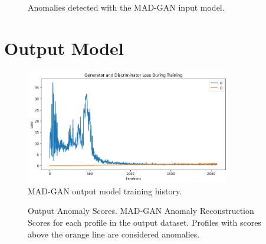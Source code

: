 \begin{figure}
    \caption{Anomalies detected with the MAD-GAN input model.}
    \label{fig_a:madgan_in_anomalies}
\end{figure}

\clearpage
\section{Output Model}

\begin{figure}[h]
    \centering
    \includegraphics[width=0.8\textwidth]{figures/madgan_train_hist_out.png}
    \caption{MAD-GAN output model training history.}
\end{figure}

\begin{figure}
    \centering
    \caption[Output Anomaly Scores]{Output Anomaly Scores. MAD-GAN Anomaly Reconstruction Scores for each profile in the output dataset. Profiles with scores above the orange line are considered anomalies.}
\end{figure}

